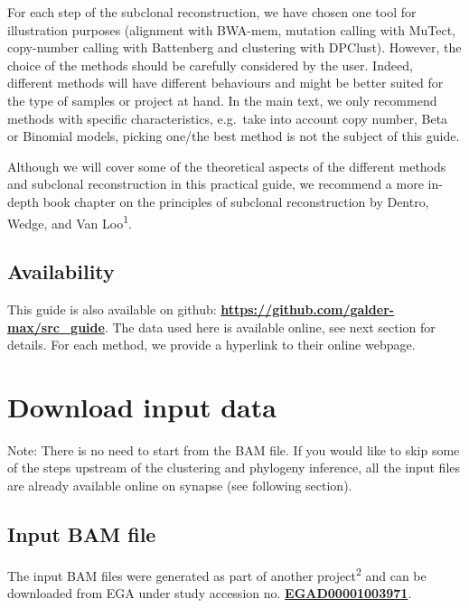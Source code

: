 \documentclass[]{article}
\begin{document}
For each step of the subclonal reconstruction, we have chosen one tool
for illustration purposes (alignment with BWA-mem, mutation calling with
MuTect, copy-number calling with Battenberg and clustering with
DPClust). However, the choice of the methods should be carefully
considered by the user. Indeed, different methods will have different
behaviours and might be better suited for the type of samples or project
at hand. In the main text, we only recommend methods with specific
characteristics, e.g.~take into account copy number, Beta or Binomial
models, picking one/the best method is not the subject of this guide.

Although we will cover some of the theoretical aspects of the different
methods and subclonal reconstruction in this practical guide, we
recommend a more in-depth book chapter on the principles of subclonal
reconstruction by Dentro, Wedge, and Van Loo\textsuperscript{1}.

\hypertarget{availability}{%
\subsection{Availability}\label{availability}}

This guide is also available on github:
\textbf{\url{https://github.com/galder-max/src_guide}}. The data used
here is available online, see next section for details. For each method,
we provide a hyperlink to their online webpage.

\newpage

\hypertarget{download-input-data}{%
\section{Download input data}\label{download-input-data}}

Note: There is no need to start from the BAM file. If you would like to
skip some of the steps upstream of the clustering and phylogeny
inference, all the input files are already available online on synapse
(see following section).

\hypertarget{input-bam-file}{%
\subsection{Input BAM file}\label{input-bam-file}}

The input BAM files were generated as part of another
project\textsuperscript{2} and can be downloaded from EGA under study
accession no.
\href{https://www.ebi.ac.uk/ega/studies/EGAS00001002092}{\textbf{EGAD00001003971}}.
\end{document}
